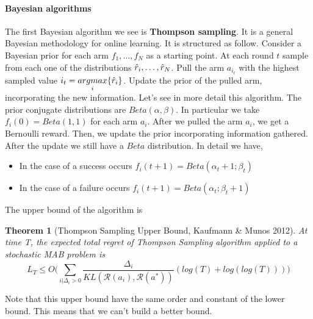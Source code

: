 \documentclass[main.tex]{subfiles}
\newtheorem{theorem}{Theorem}[section]
\begin{document}
\paragraph{Bayesian algorithms}
The first Bayesian algorithm we see is \textbf{Thompson sampling}. It is a general Bayesian methodology for online learning. It is structured as follow.
Consider a Bayesian prior for each arm $f_1,\dots,f_N$ as a starting point. At each round $t$ sample from each one of the distributions $\Hat{r}_i, \dots, \Hat{r}_N$. Pull the arm $a_{i_t}$ with the highest sampled value $i_t = \underset{i}{argmax} \{ \Hat{r}_i \}$. Update the prior of the pulled arm, incorporating the new information.
Let's see in more detail this algorithm. The prior conjugate distributions are $Beta(\alpha, \beta)$. In particular we take $f_i(0)=Beta(1,1)$ for each arm $a_i$. After we pulled the arm $a_i$, we get a Bernoulli reward. Then, we update the prior incorporating information gathered. After the update we still have a $Beta$ distribution. In detail we have,
\begin{itemize}
    \item In the case of a success occurs $f_i(t + 1) = Beta(\alpha_t + 1; \beta_t)$
    \item In the case of a failure occurs $f_i(t + 1) = Beta(\alpha_t; \beta_t + 1)$
\end{itemize}
The upper bound of the algorithm is
\begin{theorem}[Thompson Sampling Upper Bound, Kaufmann \& Munos 2012]
At time T, the expected total regret of Thompson Sampling algorithm applied
to a stochastic MAB problem is
\begin{equation*}
    L_T \leq O \Bigg( \sum_{i|\Delta_i > 0} \frac{\Delta_i}{KL(\mathcal{R}(a_i),\mathcal{R}(a^*))} (log(T) + log(log(T))) \Bigg)
\end{equation*}
\end{theorem}
Note that this upper bound have the same order and constant of the lower bound. This means that we can't build a better bound.
\end{document}
